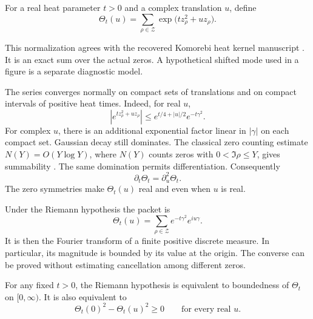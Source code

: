 \begin{definition}\label{rh:heatdef}
For a real heat parameter \(t>0\) and a complex translation \(u\), define
\begin{equation}\label{rh:theta}
\Theta_t(u)=\sum_{\rho\in\mathcal Z}
\exp\bigl(tz_\rho^2+uz_\rho\bigr).
\end{equation}
\end{definition}

This normalization agrees with the recovered Komorebi heat kernel manuscript \cite{KomorebiHeat}. It is an exact sum over the actual zeros. A hypothetical shifted mode used in a figure is a separate diagnostic model.

The series converges normally on compact sets of translations and on compact intervals of positive heat times. Indeed, for real \(u\),
\begin{equation}\label{rh:maj}
\left|e^{tz_\rho^2+uz_\rho}\right|
\le e^{t/4+|u|/2}e^{-t\gamma^2}.
\end{equation}
For complex \(u\), there is an additional exponential factor linear in \(|\gamma|\) on each compact set. Gaussian decay still dominates. The classical zero counting estimate \(N(Y)=O(Y\log Y)\), where \(N(Y)\) counts zeros with \(0<\Im\rho\le Y\), gives summability \cite[Section 2.4, equation (2.11)]{BondarenkoRadchenkoSeip}. The same domination permits differentiation. Consequently
\begin{equation}\label{rh:heatflow}
\partial_t\Theta_t=\partial_u^2\Theta_t.
\end{equation}
The zero symmetries make \(\Theta_t(u)\) real and even when \(u\) is real.

Under the Riemann hypothesis the packet is
\begin{equation}\label{rh:criticalpacket}
\Theta_t(u)=\sum_{\rho\in\mathcal Z}e^{-t\gamma^2}e^{iu\gamma}.
\end{equation}
It is then the Fourier transform of a finite positive discrete measure. In particular, its magnitude is bounded by its value at the origin. The converse can be proved without estimating cancellation among different zeros.

\begin{theorem}\label{rh:bounded}
For any fixed \(t>0\), the Riemann hypothesis is equivalent to boundedness of \(\Theta_t\) on \([0,\infty)\). It is also equivalent to
\begin{equation}\label{rh:det}
\Theta_t(0)^2-\Theta_t(u)^2\ge0
\qquad\text{for every real }u.
\end{equation}
\end{theorem}


